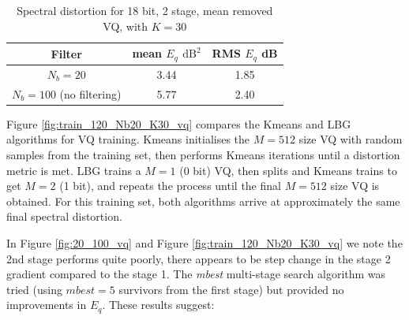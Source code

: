 \documentclass{article}
\begin{document}
\begin{table}[h]
\centering
\begin{tabular}{c c c}
 \hline
 Filter & mean $E_q$ $\textrm{dB}^2$ & RMS $E_q$ dB \\
 \hline
 $N_b=20$ & 3.44 & 1.85 \\ 
 $N_b=100$ (no filtering) & 5.77 & 2.40 \\
 \hline
\end{tabular}
\caption{Spectral distortion for 18 bit, 2 stage, mean removed VQ, with $K=30$}
\label{table:ratek2_vq}
\end{table}

Figure \ref{fig:train_120_Nb20_K30_vq} compares the Kmeans and LBG algorithms for VQ training.  Kmeans initialises the $M=512$ size VQ with random samples from the training set, then performs Kmeans iterations until a distortion metric is met. LBG trains a $M=1$ (0 bit) VQ, then splits and Kmeans trains to get $M=2$ (1 bit), and repeats the process until the final $M=512$ size VQ is obtained.  For this training set, both algorithms arrive at approximately the same final spectral distortion.

In Figure \ref{fig:20_100_vq} and Figure \ref{fig:train_120_Nb20_K30_vq} we note the 2nd stage performs quite poorly, there appears to be step change in the stage 2 gradient compared to the stage 1.  The \emph{mbest} multi-stage search algorithm was tried  (using $mbest=5$ survivors from the first stage) but provided no improvements in $E_q$. These results suggest:
\end{document}
